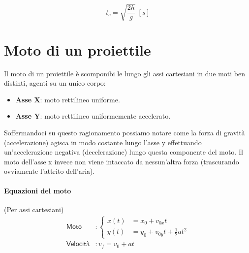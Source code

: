             \begin{equation}
                t_c=\sqrt{\frac{2h}{g}} \; [s]
            \end{equation}

    \section{Moto di un proiettile} 

        Il moto di un proiettile è scomponibi le lungo gli assi cartesiani in 
        due moti ben distinti, agenti su un unico corpo:
        \begin{itemize}
            \item \textbf{Asse X}: moto rettilineo uniforme.
            \item \textbf{Asse Y}: moto rettilineo uniformemente accelerato.
        \end{itemize}
        Soffermandoci su questo ragionamento possiamo notare come la forza di 
        gravità (accelerazione) agisca in modo costante lungo l'asse y 
        effettuando un'accelerazione negativa (decelerazione) lungo questa 
        componente del moto. Il moto dell'asse x invece non viene intaccato da 
        nessun'altra forza (trascurando ovviamente l'attrito dell'aria).
        
        \paragraph{Equazioni del moto}
        (Per assi cartesiani)
        \begin{align}
            \textsf{Moto} &: \begin{cases}
                    x(t) &= x_0 + v_{0x}t \\
                    y(t) &= y_0 + v_{0y}t + \frac{1}{2}at^2
                \end{cases} \\
                \textsf{Velocità} &: v_{f} = v_{0} + at
        \end{align}

